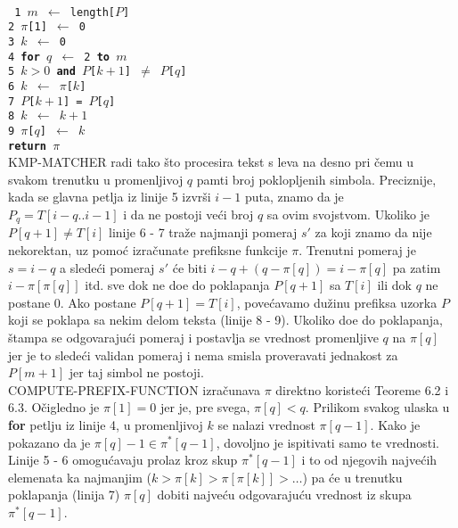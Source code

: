 \documentclass[a4paper,12pt]{article}
\begin{document}
 \\
\texttt{
\noindent \phantom{1}1 $m$ $\leftarrow$ length[$P$] \\
\noindent \phantom{1}2 $\pi$[1] $\leftarrow$ 0 \\
\noindent \phantom{1}3 $k$ $\leftarrow$ 0 \\
\noindent \phantom{1}4 {\bf for} $q$ $\leftarrow$ 2 {\bf to} $m$ \\
\noindent \phantom{1}5  $k > 0$ {\bf and} $P$[$k + 1$] $\neq$ $P$[$q$] \\
\noindent \phantom{1}6 \indent \indent \indent {} $k$ $\leftarrow$ $\pi$[$k$] \\
\noindent \phantom{1}7 \indent {} $P$[$k + 1$] = $P$[$q$]\\
\noindent \phantom{1}8 \indent \indent {} $k$ $\leftarrow$ $k + 1$ \\
\noindent \phantom{1}9 \indent \indent $\pi$[$q$] $\leftarrow$ $k$ \\
 {\bf return} $\pi$
}
\\

KMP-MATCHER radi tako \v sto procesira tekst s leva na desno pri \v cemu u svakom trenutku u promenljivoj $q$ pamti broj poklopljenih simbola. Preciznije, kada se glavna petlja iz linije 5 izvr\v si $i - 1$ puta, znamo da je $P_q = T[i - q..i - 1]$ i da ne postoji ve\' ci broj $q$ sa ovim svojstvom. Ukoliko je $P[q + 1] \neq T[i]$ linije 6 - 7 tra\v ze najmanji pomeraj $s'$ za koji znamo da nije nekorektan, uz pomo\' c izra\v cunate prefiksne funkcije $\pi$. Trenutni pomeraj je $s = i - q$ a slede\' ci pomeraj $s'$ \' ce biti $i - q + (q - \pi[q]) = i - \pi[q]$ pa zatim $i - \pi[\pi[q]]$ itd. sve dok ne do\dj e do poklapanja $P[q + 1]$ sa $T[i]$ ili dok $q$ ne postane 0. Ako postane $P[q + 1] = T[i]$, pove\' cavamo du\v zinu prefiksa uzorka $P$ koji se poklapa sa nekim delom teksta (linije 8 - 9). Ukoliko do\dj e do poklapanja, \v stampa se odgovaraju\' ci pomeraj i postavlja se vrednost promenljive $q$ na $\pi[q]$ jer je to slede\' ci validan pomeraj i nema smisla proveravati jednakost za $P[m + 1]$ jer taj simbol ne postoji.
\\

COMPUTE-PREFIX-FUNCTION izra\v cunava $\pi$ direktno koriste\' ci Teoreme 6.2 i 6.3. O\v cigledno je $\pi[1] = 0$ jer je, pre svega, $\pi[q] < q$. Prilikom svakog ulaska u {\bf for} petlju iz linije 4, u promenljivoj $k$ se nalazi vrednost $\pi[q - 1]$. Kako je pokazano da je $\pi[q] - 1 \in \pi^\ast[q - 1]$, dovoljno je ispitivati samo te vrednosti. Linije 5 - 6 omogu\' cavaju prolaz kroz skup $\pi^\ast[q - 1]$ i to od njegovih najve\' cih elemenata ka najmanjim ($k > \pi[k] > \pi[\pi[k]] > \ldots$) pa \' ce u trenutku poklapanja (linija 7) $\pi[q]$ dobiti najve\' cu odgovaraju\' cu vrednost iz skupa $\pi^\ast[q - 1]$.
\\
\end{document}
